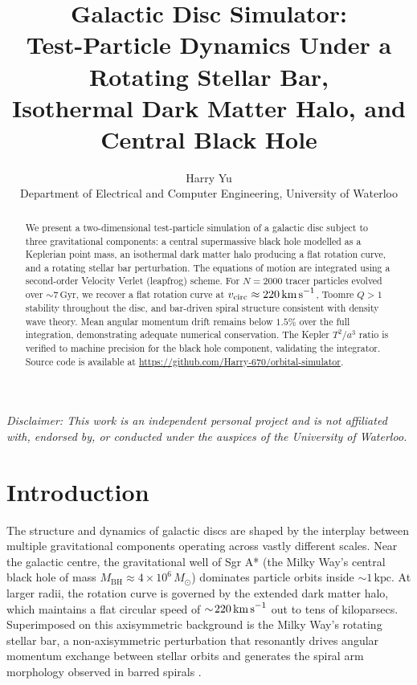 \documentclass[12pt, letterpaper]{article}
\title{%
    \textbf{Galactic Disc Simulator:}\\
    \large Test-Particle Dynamics Under a Rotating Stellar Bar,\\
    Isothermal Dark Matter Halo, and Central Black Hole
}
\author{Harry Yu\\
    \small Department of Electrical and Computer Engineering, University of Waterloo\\
}
\date{}
\begin{document}
\maketitle
\thispagestyle{fancy}

\begin{abstract}
We present a two-dimensional test-particle simulation of a galactic disc subject to three gravitational components: a central supermassive black hole modelled as a Keplerian point mass, an isothermal dark matter halo producing a flat rotation curve, and a rotating stellar bar perturbation. The equations of motion are integrated using a second-order Velocity Verlet (leapfrog) scheme. For $N = 2000$ tracer particles evolved over $\sim\!7\,\text{Gyr}$, we recover a flat rotation curve at $v_\text{circ} \approx 220\,\text{km\,s}^{-1}$, Toomre $Q > 1$ stability throughout the disc, and bar-driven spiral structure consistent with density wave theory. Mean angular momentum drift remains below $1.5\%$ over the full integration, demonstrating adequate numerical conservation. The Kepler $T^2/a^3$ ratio is verified to machine precision for the black hole component, validating the integrator. Source code is available at \url{https://github.com/Harry-670/orbital-simulator}.
\end{abstract}

\vspace{0.5em}
\noindent\small\textit{Disclaimer: This work is an independent personal project and is not affiliated with, endorsed by, or conducted under the auspices of the University of Waterloo.}

\section{Introduction}
\label{sec:intro}

The structure and dynamics of galactic discs are shaped by the interplay between multiple gravitational components operating across vastly different scales. Near the galactic centre, the gravitational well of Sgr A* (the Milky Way's central black hole of mass $M_\text{BH} \approx 4 \times 10^6\,M_\odot$) dominates particle orbits inside $\sim\!1\,\text{kpc}$. At larger radii, the rotation curve is governed by the extended dark matter halo, which maintains a flat circular speed of $\sim\!220\,\text{km\,s}^{-1}$ out to tens of kiloparsecs. Superimposed on this axisymmetric background is the Milky Way's rotating stellar bar, a non-axisymmetric perturbation that resonantly drives angular momentum exchange between stellar orbits and generates the spiral arm morphology observed in barred spirals \citep{BinneyTremaine2008}.
\end{document}
